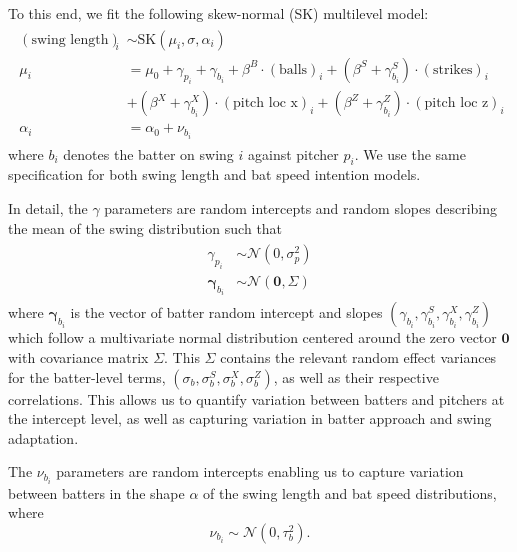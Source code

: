 \documentclass[
  12pt]{article}
\begin{document}
    To this end, we fit the following skew-normal (SK) multilevel model:
    \begin{align}
    \label{eqn:intention-swing-length}
    \begin{split}
        ( \mbox{swing length} )_i &\sim \mbox{SK}(\mu_i, \sigma, \alpha_i) \\
        \mu_i &= \mu_0 + \gamma_{p_i} + \gamma_{b_i}
        + \beta^B \cdot (\mbox{balls})_i
          + (\beta^S + \gamma^S_{b_i}) \cdot (\mbox{strikes})_i\\
        & + (\beta^X + \gamma^X_{b_i}) \cdot (\mbox{pitch loc x})_i
          + (\beta^Z + \gamma^Z_{b_i}) \cdot (\mbox{pitch loc z})_i \\
          \alpha_i &= \alpha_0 + \nu_{b_i}
    \end{split}
    \end{align}
    where $b_i$ denotes the batter on swing $i$ against pitcher $p_i$. We use the same specification for both swing length and bat speed intention models. 
    
    In detail, the $\gamma$ parameters are random intercepts and random slopes describing the mean of the swing distribution such that
    \begin{align}
        \begin{split}
            \gamma_{p_i} &\sim \mathcal{N}(0, \sigma^2_p) \\
            \boldsymbol{\gamma}_{b_i} &\sim \mathcal{N}(\boldsymbol{0}, \Sigma)
        \end{split}
    \end{align}
    where $\boldsymbol{\gamma}_{b_i}$ is the vector of batter random intercept and slopes $(\gamma_{b_i}, \gamma^S_{b_i}, \gamma^X_{b_i}, \gamma^Z_{b_i})$ which follow a multivariate normal distribution centered around the zero vector $\boldsymbol{0}$ with covariance matrix $\Sigma$. This $\Sigma$ contains the relevant random effect variances for the batter-level terms, $(\sigma_b, \sigma_b^S, \sigma_b^X, \sigma_b^Z)$, as well as their respective correlations. This allows us to quantify variation between batters and pitchers at the intercept level, as well as capturing variation in batter approach and swing adaptation.
    
    The $\nu_{b_i}$ parameters are random intercepts enabling us to capture variation between batters in the shape $\alpha$ of the swing length and bat speed distributions, where
    \begin{equation}
        \nu_{b_i} \sim \mathcal{N}(0, \tau^2_b).
    \end{equation}
\end{document}
